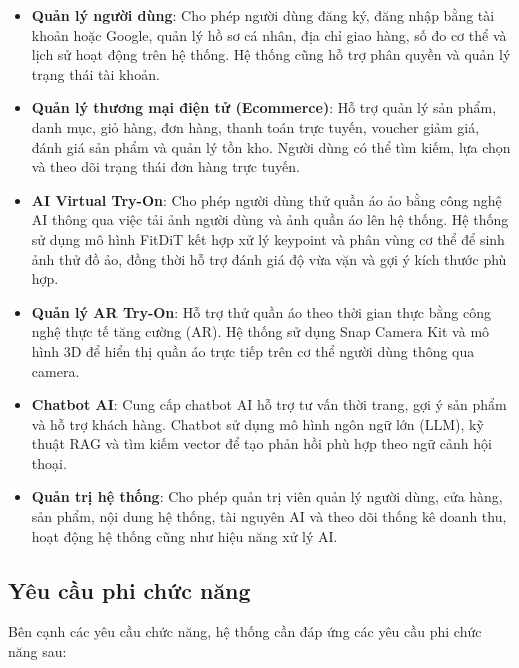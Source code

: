 \begin{itemize}

    \item \textbf{Quản lý người dùng}: 
    Cho phép người dùng đăng ký, đăng nhập bằng tài khoản hoặc Google, quản lý hồ sơ cá nhân, địa chỉ giao hàng, số đo cơ thể và lịch sử hoạt động trên hệ thống. Hệ thống cũng hỗ trợ phân quyền và quản lý trạng thái tài khoản.

    \item \textbf{Quản lý thương mại điện tử (Ecommerce)}: 
    Hỗ trợ quản lý sản phẩm, danh mục, giỏ hàng, đơn hàng, thanh toán trực tuyến, voucher giảm giá, đánh giá sản phẩm và quản lý tồn kho. Người dùng có thể tìm kiếm, lựa chọn và theo dõi trạng thái đơn hàng trực tuyến.

    \item \textbf{AI Virtual Try-On}: 
    Cho phép người dùng thử quần áo ảo bằng công nghệ AI thông qua việc tải ảnh người dùng và ảnh quần áo lên hệ thống. Hệ thống sử dụng mô hình FitDiT kết hợp xử lý keypoint và phân vùng cơ thể để sinh ảnh thử đồ ảo, đồng thời hỗ trợ đánh giá độ vừa vặn và gợi ý kích thước phù hợp.

    \item \textbf{Quản lý AR Try-On}: 
    Hỗ trợ thử quần áo theo thời gian thực bằng công nghệ thực tế tăng cường (AR). Hệ thống sử dụng Snap Camera Kit và mô hình 3D để hiển thị quần áo trực tiếp trên cơ thể người dùng thông qua camera.

    \item \textbf{Chatbot AI}: 
    Cung cấp chatbot AI hỗ trợ tư vấn thời trang, gợi ý sản phẩm và hỗ trợ khách hàng. Chatbot sử dụng mô hình ngôn ngữ lớn (LLM), kỹ thuật RAG và tìm kiếm vector để tạo phản hồi phù hợp theo ngữ cảnh hội thoại.

    \item \textbf{Quản trị hệ thống}: 
    Cho phép quản trị viên quản lý người dùng, cửa hàng, sản phẩm, nội dung hệ thống, tài nguyên AI và theo dõi thống kê doanh thu, hoạt động hệ thống cũng như hiệu năng xử lý AI.

\end{itemize}

\subsection{Yêu cầu phi chức năng}

Bên cạnh các yêu cầu chức năng, hệ thống cần đáp ứng các yêu cầu phi chức năng sau:

